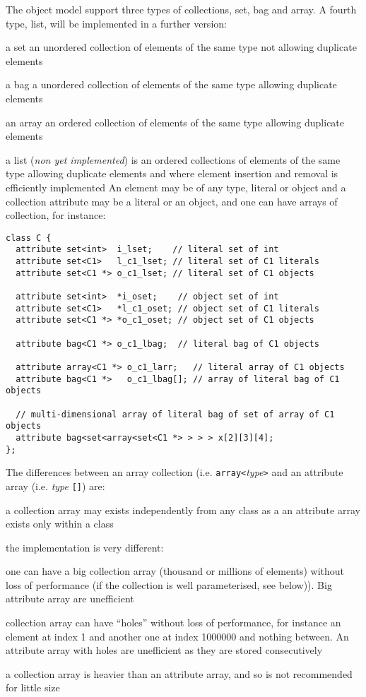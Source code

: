 The \eyedb object model support three types of collections, set, bag and array. A fourth type, list, will be implemented in a further version:
\bi
\item a set an unordered collection of elements of the same type
not allowing duplicate elements
\item a bag a unordered collection of elements of the same type
allowing duplicate elements
\item an array an ordered collection of elements of the same type
allowing duplicate elements
\item a list (\emph{non yet implemented}) is an ordered collections of elements of
the same type allowing duplicate elements
and where element insertion and removal is
efficiently implemented
\ei
An element may be of any type, literal or object and
a collection attribute may be a literal or an object, and one can have
arrays of collection, for instance:
\vspace{-0.2cm}
\begin{verbatim}
class C {
  attribute set<int>  i_lset;    // literal set of int
  attribute set<C1>   l_c1_lset; // literal set of C1 literals
  attribute set<C1 *> o_c1_lset; // literal set of C1 objects

  attribute set<int>  *i_oset;    // object set of int
  attribute set<C1>   *l_c1_oset; // object set of C1 literals
  attribute set<C1 *> *o_c1_oset; // object set of C1 objects

  attribute bag<C1 *> o_c1_lbag;  // literal bag of C1 objects

  attribute array<C1 *> o_c1_larr;   // literal array of C1 objects
  attribute bag<C1 *>   o_c1_lbag[]; // array of literal bag of C1 objects

  // multi-dimensional array of literal bag of set of array of C1 objects
  attribute bag<set<array<set<C1 *> > > > x[2][3][4]; 
};
\end{verbatim}
The differences between an array collection (i.e.
\texttt{array<}\emph{type}\texttt{>} and an attribute array (i.e. 
\emph{type} \texttt{[]}) are:
\bi
\item a collection array may exists independently from any class as a
an attribute array exists only within a class
\item the implementation is very different:
\bi
\item one can have a big collection array (thousand or millions of elements)
without loss of performance (if the collection is well parameterised, see
below)). Big attribute array are unefficient
\item collection array can have ``holes'' without loss of performance, for instance an element at index 1 and another one at index 1000000 and nothing between. An attribute array with holes are unefficient as they are stored
consecutively
\item a collection array is heavier than an attribute array, and so is not
recommended for little size
\ei
\ei

